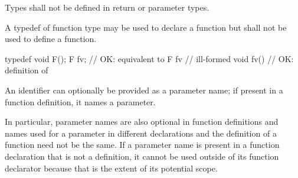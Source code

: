 \pnum
Types shall not be defined in return or parameter types.

\pnum
{}%
A typedef of function type may be used to declare a function but shall not be
used to define a function.
\begin{example}

\begin{codeblock}
typedef void F();
F  fv;              // OK: equivalent to 
F  fv { }           // ill-formed
void fv() { }       // OK: definition of 
\end{codeblock}
\end{example}

\pnum
An identifier can optionally be provided as a parameter name;
if present in a function definition, it names a parameter.
\begin{note}
In particular, parameter names are also optional in function definitions
and names used for a parameter in different declarations and the definition
of a function need not be the same.
If a parameter name is present in a function declaration that is not a definition,
it cannot be used outside of
its function declarator because that is the extent of its potential scope.
\end{note}

